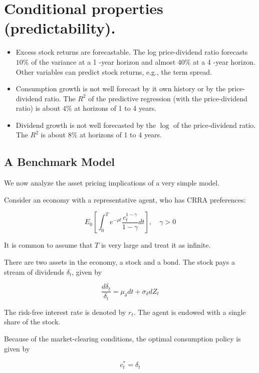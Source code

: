 \documentclass[\topdir/lecture\_notes.tex]{subfiles}
\begin{document}
\section{Conditional properties (predictability).}
\begin{itemize}
  \item Excess stock returns are forecastable. The log price-dividend ratio forecasts \(10 \%\) of the variance at a 1 -year horizon and almost \(40 \%\) at a 4 -year horizon. Other variables can predict stock returns, e.g., the term spread.
  \item Consumption growth is not well forecast by it own history or by the price-dividend ratio. The \(R^{2}\) of the predictive regression (with the price-dividend ratio) is about \(4 \%\) at horizons of 1 to 4 years.
  \item Dividend growth is not well forecasted by the \(\log\) of the price-dividend ratio. The \(R^{2}\) is about \(8 \%\) at horizons of 1 to 4 years.
\end{itemize}

\subsection{A Benchmark Model}
We now analyze the asset pricing implications of a very simple model.

Consider an economy with a representative agent, who has CRRA preferences:

\begin{equation}
E_{0}\left[\int_{0}^{T} e^{-\rho t} \frac{c_{t}^{1-\gamma}}{1-\gamma} d t\right], \quad \gamma>0
\end{equation}

It is common to assume that \(T\) is very large and treat it as infinite.

There are two assets in the economy, a stock and a bond. The stock pays a stream of dividends \(\delta_{t}\), given by

\begin{equation}
\frac{d \delta_{t}}{\delta_{t}}=\mu_{\delta} d t+\sigma_{\delta} d Z_{t}
\end{equation}

The risk-free interest rate is denoted by \(r_{t}\). The agent is endowed with a single share of the stock.

Because of the market-clearing conditions, the optimal consumption policy is given by

\begin{equation}
c_{t}^{*}=\delta_{t}
\end{equation}
\end{document}
